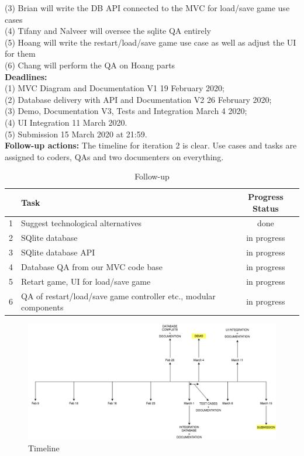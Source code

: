 \documentclass[12pt]{article}
\begin{document}
(3) Brian will write the DB API connected to the MVC for load/save game use cases\\
(4) Tifany and Nalveer will oversee the sqlite QA entirely\\
(5) Hoang will write the restart/load/save game use case as well as adjust the UI for them\\
(6) Chang will perform the QA on Hoang parts\\
{\bf Deadlines:} \\
(1) MVC Diagram and Documentation V1 19 February 2020;\\
(2) Database delivery with API and Documentation V2 26 February 2020;\\
(3) Demo, Documentation V3, Tests and Integration March 4 2020; \\
(4) UI Integration 11 March 2020. \\
(5) Submission 15 March 2020 at 21:59. \\
{\bf Follow-up actions:} The timeline for iteration 2 is clear. Use cases and tasks are assigned to coders, QAs and two documenters on everything.\\

\begin{table}[h!]
\centering
 \begin{tabular}{||l l c ||} 
 \hline
   & Task & Progress Status\\ [0.5ex] 
 \hline\hline
 1 & Suggest technological alternatives & done \\
 2 & SQlite database & in progress\\
 3 & SQlite database API & in progress\\
 4 & Database QA from our MVC code base & in progress\\
 5 & Retart game, UI for load/save game & in progress\\
 6 & QA of restart/load/save game controller etc., modular components & in progress\\[1ex] 
 \hline
 \end{tabular}
\caption{Follow-up }
\label{table:1}
\end{table}

\begin{figure}[htbp]
    \centering
    \includegraphics[scale=0.5]{timeline.png}
    \caption{Timeline}
    \label{fig:UI-1}
\end{figure}

\newpage
\end{document}
